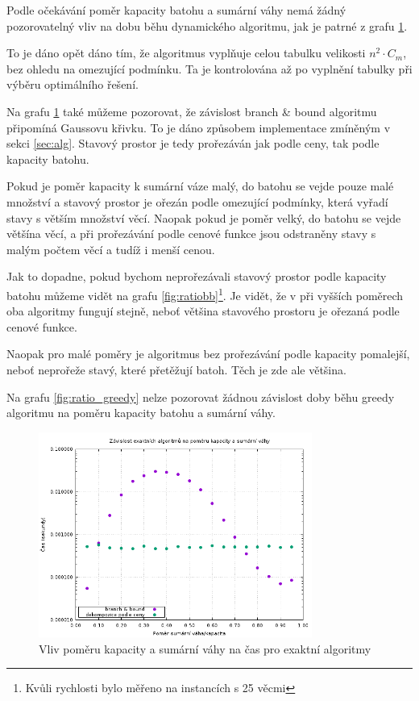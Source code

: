 \documentclass[11pt]{article}
\begin{document}
Podle očekávání poměr kapacity batohu a sumární váhy nemá žádný pozorovatelný vliv na dobu běhu dynamického algoritmu, jak je patrné z grafu \ref{fig:ratio1}. 

To je dáno opět dáno tím, že algoritmus vyplňuje celou tabulku velikosti $n^2 \cdot C_m$, bez ohledu na omezující podmínku. Ta je kontrolována až po vyplnění tabulky při výběru optimálního řešení.

Na grafu \ref{fig:ratio1} také můžeme pozorovat, že závislost branch \& bound algoritmu připomíná Gaussovu křivku. To je dáno způsobem implementace zmíněným v sekci \ref{sec:alg}. Stavový prostor je tedy prořezáván jak podle ceny, tak podle kapacity batohu.

Pokud je poměr kapacity k sumární váze malý, do batohu se vejde pouze malé množství a stavový prostor je ořezán podle omezující podmínky, která vyřadí stavy s větším množství věcí. Naopak pokud je poměr velký, do batohu se vejde většína věcí, a při prořezávání podle cenové funkce jsou odstraněny stavy s malým počtem věcí a tudíž i menší cenou.

Jak to dopadne, pokud bychom neprořezávali stavový prostor podle kapacity batohu můžeme vidět na grafu \ref{fig:ratiobb}\footnote{Kvůli rychlosti bylo měřeno na instancích s 25 věcmi}. Je vidět, že v při vyšších poměrech oba algoritmy fungují stejně, neboť většina stavového prostoru je ořezaná podle cenové funkce.

Naopak pro malé poměry je algoritmus bez prořezávání podle kapacity pomalejší, neboť neprořeže stavý, které přetěžují batoh. Těch je zde ale většina.

Na grafu \ref{fig:ratio_greedy} nelze pozorovat žádnou závislost doby běhu greedy algoritmu na poměru kapacity batohu a sumární váhy.

\begin{figure}[h!]
	\centering
    	\includegraphics[width=0.8\textwidth]{../data/ratio1.png}
	\caption{Vliv poměru kapacity a sumární váhy na čas pro exaktní algoritmy}
	\label{fig:ratio1}
\end{figure}
\end{document}
